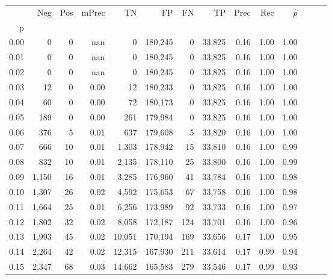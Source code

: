\begin{tabular}{rrrrrrrrrrrrrr}
\toprule
{} &    Neg &  Pos & mPrec &       TN &       FP &      FN &      TP &  Prec &   Rec & $\hat{p}$ \\
p    &        &      &       &          &          &         &         &       &       &           \\
\midrule
0.00 &      0 &    0 &   nan &        0 &  180,245 &       0 &  33,825 &  0.16 &  1.00 &      1.00 \\
0.01 &      0 &    0 &   nan &        0 &  180,245 &       0 &  33,825 &  0.16 &  1.00 &      1.00 \\
0.02 &      0 &    0 &   nan &        0 &  180,245 &       0 &  33,825 &  0.16 &  1.00 &      1.00 \\
0.03 &     12 &    0 &  0.00 &       12 &  180,233 &       0 &  33,825 &  0.16 &  1.00 &      1.00 \\
0.04 &     60 &    0 &  0.00 &       72 &  180,173 &       0 &  33,825 &  0.16 &  1.00 &      1.00 \\
0.05 &    189 &    0 &  0.00 &      261 &  179,984 &       0 &  33,825 &  0.16 &  1.00 &      1.00 \\
0.06 &    376 &    5 &  0.01 &      637 &  179,608 &       5 &  33,820 &  0.16 &  1.00 &      1.00 \\
0.07 &    666 &   10 &  0.01 &    1,303 &  178,942 &      15 &  33,810 &  0.16 &  1.00 &      0.99 \\
0.08 &    832 &   10 &  0.01 &    2,135 &  178,110 &      25 &  33,800 &  0.16 &  1.00 &      0.99 \\
0.09 &  1,150 &   16 &  0.01 &    3,285 &  176,960 &      41 &  33,784 &  0.16 &  1.00 &      0.98 \\
0.10 &  1,307 &   26 &  0.02 &    4,592 &  175,653 &      67 &  33,758 &  0.16 &  1.00 &      0.98 \\
0.11 &  1,664 &   25 &  0.01 &    6,256 &  173,989 &      92 &  33,733 &  0.16 &  1.00 &      0.97 \\
0.12 &  1,802 &   32 &  0.02 &    8,058 &  172,187 &     124 &  33,701 &  0.16 &  1.00 &      0.96 \\
0.13 &  1,993 &   45 &  0.02 &   10,051 &  170,194 &     169 &  33,656 &  0.17 &  1.00 &      0.95 \\
0.14 &  2,264 &   42 &  0.02 &   12,315 &  167,930 &     211 &  33,614 &  0.17 &  0.99 &      0.94 \\
0.15 &  2,347 &   68 &  0.03 &   14,662 &  165,583 &     279 &  33,546 &  0.17 &  0.99 &      0.93 \\

\end{tabular}
